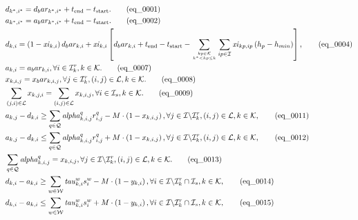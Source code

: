 \begin{align}
  & d_{k^{*} , i^{*}} = d_bar_{k^{*} , i^{*}} + t_{\text{end}} - t_{\text{start}} . \tag{eq\_0001} \\
  & a_{k^{*} , i^{*}} = a_bar_{k^{*} , i^{*}} + t_{\text{end}} - t_{\text{start}} . \tag{eq\_0002} \\
  & d_{k , i} = \left(1 - \mathit{xi}_{k , i}\right) d_bar_{k , i} + \mathit{xi}_{k , i} \left[d_bar_{k , i} + t_{\text{end}} - t_{\text{start}} - \underset{\genfrac{}{}{0pt}{}{kp \in \mathcal{K}}{k^{*} < kp \leq k}}{\sum} \sum_{ip \in \mathcal{I}} \mathit{xi}_{kp , ip} \left(h_{p} - h_{min}\right)\right] , \tag{eq\_0004} \\
  & a_{k , i} = a_bar_{k , i} , \forall i \in \mathcal{I}_{k}^{r} , k \in \mathcal{K} . \tag{eq\_0007} \\
  & x_{k , i , j} = x_bar_{k , i , j} , \forall j \in \mathcal{I}_{k}^{r} , \left(i , j\right) \in \mathcal{L} , k \in \mathcal{K} . \tag{eq\_0008} \\
  & \sum_{\left(j , i\right) \in \mathcal{L}} x_{k , j , i} = \sum_{\left(i , j\right) \in \mathcal{L}} x_{k , i , j} , \forall i \in \mathcal{I}_{s} , k \in \mathcal{K} . \tag{eq\_0009} \\
  & a_{k , j} - d_{k , i} \geq \sum_{q \in \mathcal{Q}} \mathit{alpha}_{k , i , j}^{q} r_{i , j}^{q} - M \cdot \left(1 - x_{k , i , j}\right) , \forall j \in \mathcal{I} \backslash \mathcal{I}_{k}^{r} , \left(i , j\right) \in \mathcal{L} , k \in \mathcal{K} , \tag{eq\_0011} \\
  & a_{k , j} - d_{k , i} \leq \sum_{q \in \mathcal{Q}} \mathit{alpha}_{k , i , j}^{q} r_{i , j}^{q} + M \cdot \left(1 - x_{k , i , j}\right) , \forall j \in \mathcal{I} \backslash \mathcal{I}_{k}^{r} , \left(i , j\right) \in \mathcal{L} , k \in \mathcal{K} , \tag{eq\_0012} \\
  & \sum_{q \in \mathcal{Q}} \mathit{alpha}_{k , i , j}^{q} = x_{k , i , j} , \forall j \in \mathcal{I} \backslash \mathcal{I}_{k}^{r} , \left(i , j\right) \in \mathcal{L} , k \in \mathcal{K} . \tag{eq\_0013} \\
  & d_{k , i} - a_{k , i} \geq \sum_{w \in \mathcal{W}} \mathit{tau}_{k , i}^{w} s_{i}^{w} - M \cdot \left(1 - y_{k , i}\right) , \forall i \in \mathcal{I} \backslash \mathcal{I}_{k}^{r} \cap \mathcal{I}_{s} , k \in \mathcal{K} , \tag{eq\_0014} \\
  & d_{k , i} - a_{k , i} \leq \sum_{w \in \mathcal{W}} \mathit{tau}_{k , i}^{w} s_{i}^{w} + M \cdot \left(1 - y_{k , i}\right) , \forall i \in \mathcal{I} \backslash \mathcal{I}_{k}^{r} \cap \mathcal{I}_{s} , k \in \mathcal{K} , \tag{eq\_0015} \\

\end{align}
